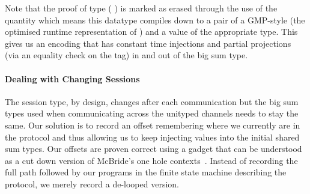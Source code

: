 \documentclass{easychair}
\begin{document}

Note that the proof of type
(   )
is marked as erased through the use of the 
quantity which means this datatype compiles down to a pair of a
GMP-style  (the optimised runtime representation of )
and a value of the appropriate type.
%
This gives us an encoding that has constant time injections
and partial projections (via an equality check on the  tag)
in and out of the big sum type.

\paragraph{Dealing with Changing Sessions}
The session type, by design, changes after each communication
but the big sum types used when communicating across the
unityped channels needs to stay the same.
%
Our solution is to record an offset remembering where we currently
are in the protocol and thus allowing us to keep injecting values
into the initial shared sum types.
%
Our offsets are proven correct using a gadget that can be understood
as a cut down version of McBride's one hole
contexts~\cite{DBLP:conf/popl/McBride08}. Instead
of recording the full path followed by our programs in the finite
state machine describing the protocol,
we merely record a de-looped version.
\end{document}

